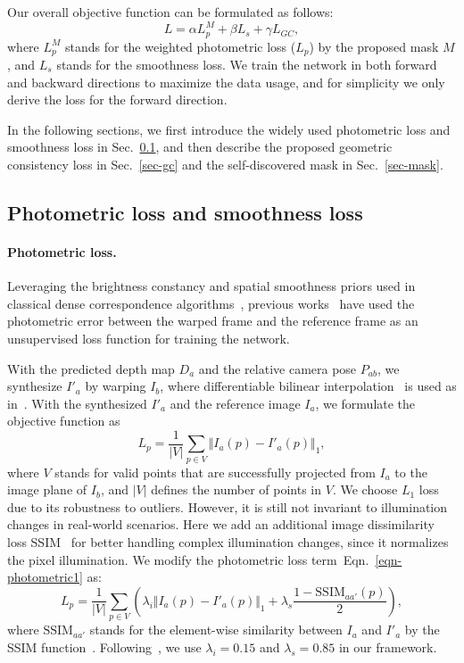 \documentclass{article}
\newcommand{\equref}[1]{Eqn.~\ref{#1}}
\newcommand{\secref}[1]{Sec.~\ref{#1}}
\begin{document}
Our overall objective function can be formulated as follows:
\begin{equation}\label{eqn-totalloss}
L = \alpha L_{p}^M + \beta L_{s} + \gamma L_{GC},
\end{equation}
where $L_{p}^M$ stands for the weighted photometric loss ($L_{p}$) by the proposed mask $M$, and $L_{s}$ stands for the smoothness loss.
We train the network in both forward and backward directions to maximize the data usage, and for simplicity we only derive the loss for the forward direction.

In the following sections, we first introduce the widely used photometric loss and smoothness loss in \secref{sec-photo-smooth}, and then describe the proposed geometric consistency loss in \secref{sec-gc} and the self-discovered mask in \secref{sec-mask}.


\subsection{Photometric loss and smoothness loss}\label{sec-photo-smooth}

\paragraph{Photometric loss.}
Leveraging the brightness constancy and spatial smoothness priors used in classical dense correspondence algorithms~\cite{baker2004lucas},
previous works~\cite{zhou2017unsupervised, yin2018geonet, zou2018df, ranjan2019cc} have used the photometric error between the warped frame and the reference frame as an unsupervised loss function for training the network.

With the predicted depth map $D_a$ and the relative camera pose $P_{ab}$, 
we synthesize $I'_a$ by warping $I_b$, where differentiable bilinear interpolation~\cite{jaderberg2015stn} is used as in~\cite{zhou2017unsupervised}.
With the synthesized $I'_a$ and the reference image $I_a$, we formulate the objective function as
\begin{equation}\label{eqn-photometric1}
L_{p}= \frac{1}{|V|} \sum_{p \in V} \Vert I_a(p) - I'_a(p) \Vert _1,
\end{equation}
where $V$ stands for valid points that are successfully projected from $I_a$ to the image plane of $I_b$,
and $|V|$ defines the number of points in $V$.
We choose $L_1$ loss due to its robustness to outliers. However, it is still not invariant to illumination changes in real-world scenarios. Here we add an additional image dissimilarity loss SSIM~\cite{wang2004image} for better handling complex illumination changes, since it normalizes the pixel illumination.
We modify the photometric loss term~\equref{eqn-photometric1} as:
\begin{equation}\label{eqn-photometric2}
L_{p}= \frac{1}{|V|} \sum_{p \in V} (\lambda_i  \Vert I_a(p) - I'_a(p) \Vert _1 + \lambda_s  \frac{1-\text{SSIM}_{aa'}(p)}{2} ),
\end{equation}
where $\text{SSIM}_{aa'}$ stands for the element-wise similarity between $I_a$ and $I'_a$ by the SSIM function~\cite{wang2004image}.
Following~\cite{godard2017unsupervised, yin2018geonet, ranjan2019cc}, we use  $\lambda_i = 0.15$ and $\lambda_s = 0.85$ in our framework.
\end{document}
